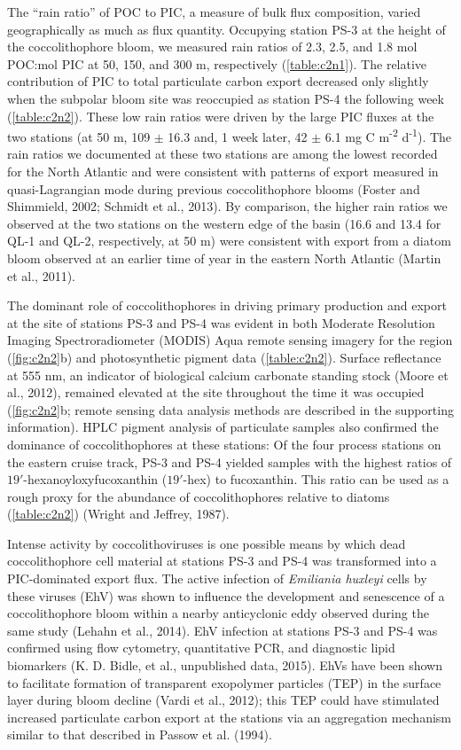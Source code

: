The ``rain ratio'' of POC to PIC, a measure of bulk flux composition, varied geographically as much as flux quantity. Occupying station PS-3 at the height of the coccolithophore bloom, we measured rain ratios of 2.3, 2.5, and 1.8 mol POC:mol PIC at 50, 150, and 300 m, respectively (\autoref{table:c2n1}). The relative contribution of PIC to total particulate carbon export decreased only slightly when the subpolar bloom site was reoccupied as station PS-4 the following week (\autoref{table:c2n2}). These low rain ratios were driven by the large PIC fluxes at the two stations (at 50 m, 109 $\pm$ 16.3 and, 1 week later, 42 $\pm$ 6.1 mg C m\textsuperscript{-2} d\textsuperscript{-1}). The rain ratios we documented at these two stations are among the lowest recorded for the North Atlantic and were consistent with patterns of export measured in quasi-Lagrangian mode during previous coccolithophore blooms (Foster and Shimmield, 2002; Schmidt et al., 2013). By comparison, the higher rain ratios we observed at the two stations on the western edge of the basin (16.6 and 13.4 for QL-1 and QL-2, respectively, at 50 m) were consistent with export from a diatom bloom observed at an earlier time of year in the eastern North Atlantic (Martin et al., 2011).

The dominant role of coccolithophores in driving primary production and export at the site of stations PS-3 and PS-4 was evident in both Moderate Resolution Imaging Spectroradiometer (MODIS) Aqua remote sensing imagery for the region (\autoref{fig:c2n2}b) and photosynthetic pigment data (\autoref{table:c2n2}). Surface reflectance at 555 nm, an indicator of biological calcium carbonate standing stock (Moore et al., 2012), remained elevated at the site throughout the time it was occupied (\autoref{fig:c2n2}b; remote sensing data analysis methods are described in the supporting information). HPLC pigment analysis of particulate samples also confirmed the dominance of coccolithophores at these stations: Of the four process stations on the eastern cruise track, PS-3 and PS-4 yielded samples with the highest ratios of $19'$-hexanoyloxyfucoxanthin ($19'$-hex) to fucoxanthin. This ratio can be used as a rough proxy for the abundance of coccolithophores relative to diatoms (\autoref{table:c2n2}) (Wright and Jeffrey, 1987).

Intense activity by coccolithoviruses is one possible means by which dead coccolithophore cell material at stations PS-3 and PS-4 was transformed into a PIC-dominated export flux. The active infection of \emph{Emiliania huxleyi} cells by these viruses (EhV) was shown to influence the development and senescence of a coccolithophore bloom within a nearby anticyclonic eddy observed during the same study (Lehahn et al., 2014). EhV infection at stations PS-3 and PS-4 was confirmed using flow cytometry, quantitative PCR, and diagnostic lipid biomarkers (K. D. Bidle, et al., unpublished data, 2015). EhVs have been shown to facilitate formation of transparent exopolymer particles (TEP) in the surface layer during bloom decline (Vardi et al., 2012); this TEP could have stimulated increased particulate carbon export at the stations via an aggregation mechanism similar to that described in Passow et al. (1994).

